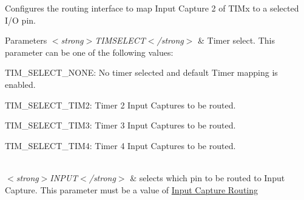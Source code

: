 Configures the routing interface to map Input Capture 2 of T\-I\-Mx to a selected I/\-O pin. 


\begin{DoxyParams}{Parameters}
{\em $<$strong$>$\-T\-I\-M\-S\-E\-L\-E\-C\-T$<$/strong$>$} & Timer select. This parameter can be one of the following values\-: \begin{DoxyItemize}
\item T\-I\-M\-\_\-\-S\-E\-L\-E\-C\-T\-\_\-\-N\-O\-N\-E\-: No timer selected and default Timer mapping is enabled. \item T\-I\-M\-\_\-\-S\-E\-L\-E\-C\-T\-\_\-\-T\-I\-M2\-: Timer 2 Input Captures to be routed. \item T\-I\-M\-\_\-\-S\-E\-L\-E\-C\-T\-\_\-\-T\-I\-M3\-: Timer 3 Input Captures to be routed. \item T\-I\-M\-\_\-\-S\-E\-L\-E\-C\-T\-\_\-\-T\-I\-M4\-: Timer 4 Input Captures to be routed. \end{DoxyItemize}
\\
\hline
{\em $<$strong$>$\-I\-N\-P\-U\-T$<$/strong$>$} & selects which pin to be routed to Input Capture. This parameter must be a value of \hyperlink{group___r_i___input_capture_routing}{Input Capture Routing} \\
\hline
\end{DoxyParams}

